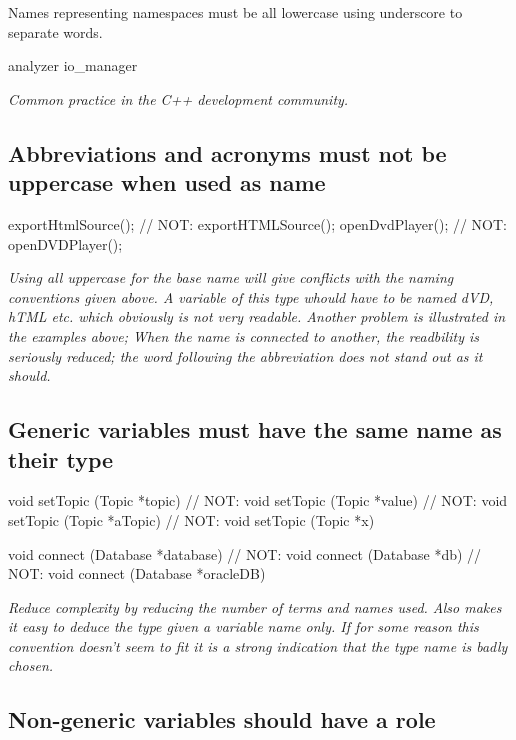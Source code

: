 \documentclass[a4paper,11pt,oneside]{scrbook}
\newcommand{\guideline}[1]{{\subsection{#1}}}
\newcommand{\motivation}[1]{{\normalfont \itshape #1}}
\begin{document}
Names representing namespaces must be all lowercase using underscore to separate
words.

\begin{code}
  analyzer
  io_manager
\end{code}

\motivation{
  Common practice in the C++ development community.
}

\guideline{Abbreviations and acronyms must not be uppercase when used as name}

\begin{code}
  exportHtmlSource();   // NOT: exportHTMLSource();
  openDvdPlayer();      // NOT: openDVDPlayer(); 
\end{code}

\motivation{ 
  Using all uppercase for the base name will give conflicts with the naming
  conventions given above. A variable of this type whould have to be named dVD,
  hTML etc. which obviously is not very readable. Another problem is illustrated
  in the examples above; When the name is connected to another, the readbility
  is seriously reduced; the word following the abbreviation does not stand out
  as it should.
}

\guideline{Generic variables must have the same name as their type}

\begin{code}
  void setTopic (Topic *topic)  // NOT: void setTopic (Topic *value)
                                // NOT: void setTopic (Topic *aTopic) 
                                // NOT: void setTopic (Topic *x) 

  void connect (Database *database)  // NOT: void connect (Database *db)
                                     // NOT: void connect (Database *oracleDB) 
\end{code}

\motivation{ 
  Reduce complexity by reducing the number of terms and names used. Also makes
  it easy to deduce the type given a variable name only. If for some reason this
  convention doesn't seem to fit it is a strong indication that the type name is
  badly chosen.
}

\guideline{Non-generic variables should have a role}
\end{document}
